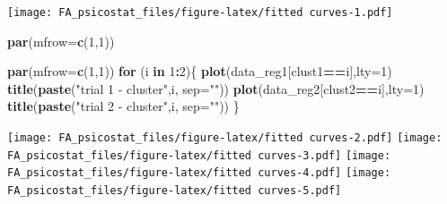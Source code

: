 \documentclass[]{article}
\newenvironment{Shaded}{\begin{snugshade}}{\end{snugshade}}
\newcommand{\ControlFlowTok}[1]{\textcolor[rgb]{0.13,0.29,0.53}{\textbf{#1}}}
\newcommand{\DataTypeTok}[1]{\textcolor[rgb]{0.13,0.29,0.53}{#1}}
\newcommand{\DecValTok}[1]{\textcolor[rgb]{0.00,0.00,0.81}{#1}}
\newcommand{\KeywordTok}[1]{\textcolor[rgb]{0.13,0.29,0.53}{\textbf{#1}}}
\newcommand{\NormalTok}[1]{#1}
\newcommand{\OperatorTok}[1]{\textcolor[rgb]{0.81,0.36,0.00}{\textbf{#1}}}
\newcommand{\StringTok}[1]{\textcolor[rgb]{0.31,0.60,0.02}{#1}}
\begin{document}
\texttt{[image: FA\_psicostat\_files/figure-latex/fitted curves-1.pdf]}

\begin{Shaded}
\begin{Highlighting}[]
\KeywordTok{par}\NormalTok{(}\DataTypeTok{mfrow=}\KeywordTok{c}\NormalTok{(}\DecValTok{1}\NormalTok{,}\DecValTok{1}\NormalTok{))}

\KeywordTok{par}\NormalTok{(}\DataTypeTok{mfrow=}\KeywordTok{c}\NormalTok{(}\DecValTok{1}\NormalTok{,}\DecValTok{1}\NormalTok{))}
\ControlFlowTok{for}\NormalTok{ (i }\ControlFlowTok{in} \DecValTok{1}\OperatorTok{:}\DecValTok{2}\NormalTok{)\{ }
\KeywordTok{plot}\NormalTok{(data_reg1[clust1}\OperatorTok{==}\NormalTok{i],}\DataTypeTok{lty=}\DecValTok{1}\NormalTok{)}
\KeywordTok{title}\NormalTok{(}\KeywordTok{paste}\NormalTok{(}\StringTok{"trial 1 - cluster"}\NormalTok{,i, }\DataTypeTok{sep=}\StringTok{""}\NormalTok{))}
\KeywordTok{plot}\NormalTok{(data_reg2[clust2}\OperatorTok{==}\NormalTok{i],}\DataTypeTok{lty=}\DecValTok{1}\NormalTok{)}
\KeywordTok{title}\NormalTok{(}\KeywordTok{paste}\NormalTok{(}\StringTok{"trial 2 - cluster"}\NormalTok{,i, }\DataTypeTok{sep=}\StringTok{""}\NormalTok{))}
\NormalTok{\}}
\end{Highlighting}
\end{Shaded}

\texttt{[image: FA\_psicostat\_files/figure-latex/fitted curves-2.pdf]}
\texttt{[image: FA\_psicostat\_files/figure-latex/fitted curves-3.pdf]}
\texttt{[image: FA\_psicostat\_files/figure-latex/fitted curves-4.pdf]}
\texttt{[image: FA\_psicostat\_files/figure-latex/fitted curves-5.pdf]}
\end{document}
